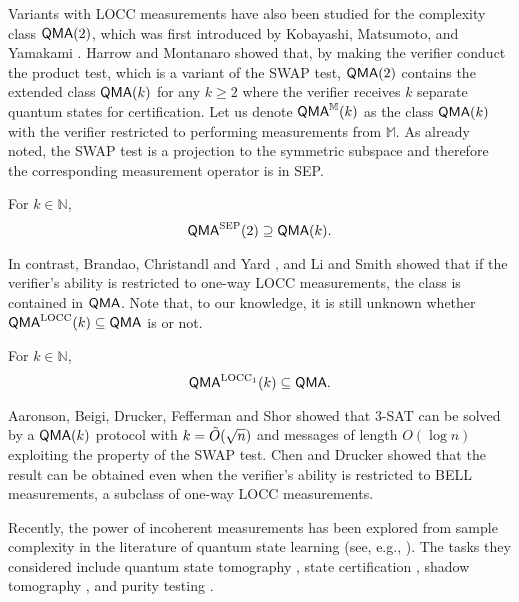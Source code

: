 Variants with LOCC measurements have also been studied for the complexity class $\mathsf{QMA}(2)$, which was first introduced by Kobayashi, Matsumoto, and Yamakami \cite{KMY03}. Harrow and Montanaro \cite{HM13} showed that, by making the verifier conduct the product test, which is a variant of the SWAP test, $\mathsf{QMA}(2)$ contains the extended class $\mathsf{QMA}(k)$ for any $k\geq 2$ where the verifier receives $k$ separate quantum states for certification. Let us denote $\mathsf{QMA}^\mathbb{M}(k)$ as the class $\mathsf{QMA}(k)$ with the verifier restricted to performing measurements from $\mathbb{M}$. As already noted, the SWAP test is a projection to the symmetric subspace and therefore the corresponding measurement operator is in SEP.

\begin{theorem}
For $k \in \mathbb{N}$,
\[
    \mathsf{QMA}^\mathrm{SEP}(2) \supseteq \mathsf{QMA}(k).
\]
\end{theorem}

In contrast, Brandao, Christandl and Yard \cite{BCY11}, and Li and Smith \cite{LS15} showed that if the verifier's ability is restricted to one-way LOCC measurements, the class is contained in $\mathsf{QMA}$. Note that, to our knowledge, it is still unknown whether $\mathsf{QMA}^{\mathrm{LOCC}}(k) \subseteq \mathsf{QMA}$ is or not.

\begin{theorem}
For $k \in \mathbb{N}$,
\[
    \mathsf{QMA}^{\mathrm{LOCC}_1}(k) \subseteq \mathsf{QMA}.
\]    
\end{theorem}

Aaronson, Beigi, Drucker, Fefferman and Shor \cite{ABD+09} showed that 3-SAT can be solved by a $\mathsf{QMA}(k)$ protocol with $k=\Tilde{O}(\sqrt{n})$ and messages of length $O(\log n)$ exploiting the property of the SWAP test. Chen and Drucker \cite{CD10} showed that the result can be obtained even when the verifier's ability is restricted to BELL measurements, a subclass of one-way LOCC measurements. 

Recently, the power of incoherent measurements has been explored from sample complexity in the literature of quantum state learning (see, e.g., \cite{BCL20,HKP21,ACQ22,CLO22,CCHL22,CHLL22,CHL+23,CLL24,CGY24}). The tasks they considered include quantum state tomography \cite{HHJ+16,OW16}, state certification \cite{BOW19}, shadow tomography \cite{Aar18,HKP20}, and purity testing \cite{MdW16}.

